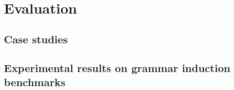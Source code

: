 \chapter{Evaluation}

\section{Case studies}
\section{Experimental results on grammar induction benchmarks}
